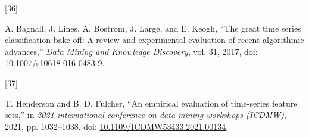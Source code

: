 \documentclass{article}
\newlength{\cslhangindent}
\newlength{\csllabelwidth}
\newlength{\cslentryspacingunit} %
\newenvironment{CSLReferences}[2] %
 {%
  \setlength{\parindent}{0pt}
  \ifodd #1
  \let\oldpar\par
  \def\par{\hangindent=\cslhangindent\oldpar}
  \fi
  \setlength{\parskip}{#2\cslentryspacingunit}
 }%
 {}
\newcommand{\CSLLeftMargin}[1]{\parbox[t]{\csllabelwidth}{#1}}
\newcommand{\CSLRightInline}[1]{\parbox[t]{\linewidth - \csllabelwidth}{#1}\break}
\begin{document}
\begin{CSLReferences}{0}{0}
\leavevmode{}%
\CSLLeftMargin{{[}36{]} }%
\CSLRightInline{A. Bagnall, J. Lines, A. Bostrom, J. Large, and E.
Keogh, {``The great time series classification bake off: A review and
experimental evaluation of recent algorithmic advances,''} \emph{Data
Mining and Knowledge Discovery}, vol. 31, 2017, doi:
\href{https://doi.org/10.1007/s10618-016-0483-9}{10.1007/s10618-016-0483-9}.}

\leavevmode{}%
\CSLLeftMargin{{[}37{]} }%
\CSLRightInline{T. Henderson and B. D. Fulcher, {``An empirical
evaluation of time-series feature sets,''} in \emph{2021 international
conference on data mining workshops (ICDMW)}, 2021, pp. 1032--1038. doi:
\href{https://doi.org/10.1109/ICDMW53433.2021.00134}{10.1109/ICDMW53433.2021.00134}.}

\end{CSLReferences}



\end{document}
